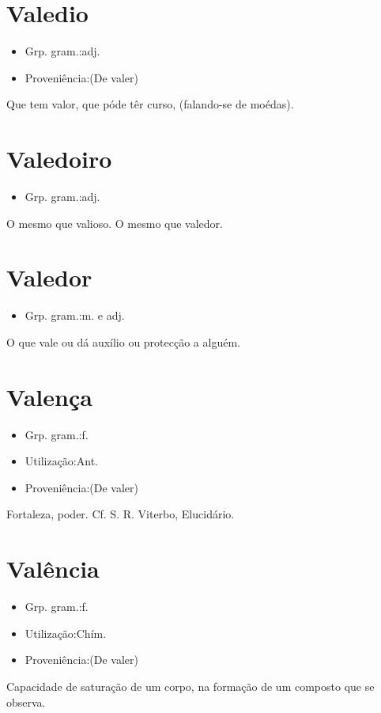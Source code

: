 \documentclass{article}
\begin{document}
\section{Valedio}
\begin{itemize}
\item {Grp. gram.:adj.}
\end{itemize}
\begin{itemize}
\item {Proveniência:(De \textunderscore valer\textunderscore )}
\end{itemize}
Que tem valor, que póde têr curso, (falando-se de moédas).
\section{Valedoiro}
\begin{itemize}
\item {Grp. gram.:adj.}
\end{itemize}
O mesmo que \textunderscore valioso\textunderscore .
O mesmo que \textunderscore valedor\textunderscore .
\section{Valedor}
\begin{itemize}
\item {Grp. gram.:m.  e  adj.}
\end{itemize}
O que vale ou dá auxílio ou protecção a alguém.
\section{Valença}
\begin{itemize}
\item {Grp. gram.:f.}
\end{itemize}
\begin{itemize}
\item {Utilização:Ant.}
\end{itemize}
\begin{itemize}
\item {Proveniência:(De \textunderscore valer\textunderscore )}
\end{itemize}
Fortaleza, poder. Cf. S. R. Viterbo, \textunderscore Elucidário\textunderscore .
\section{Valência}
\begin{itemize}
\item {Grp. gram.:f.}
\end{itemize}
\begin{itemize}
\item {Utilização:Chím.}
\end{itemize}
\begin{itemize}
\item {Proveniência:(De \textunderscore valer\textunderscore )}
\end{itemize}
Capacidade de saturação de um corpo, na formação de um composto que se observa.
\end{document}
